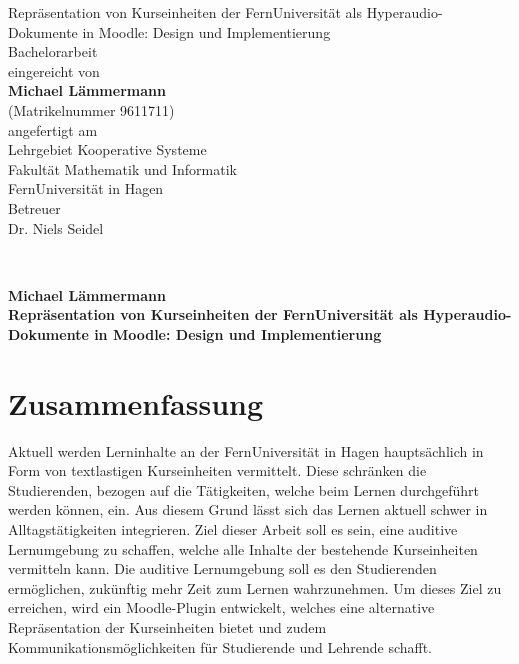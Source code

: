 \documentclass[twoside,bibliography=totoc,openany,numbers=noenddot]{fumi}
\title{\thesistitle}
\author{\thesisauthor}
\date{\today}
\newcommand{\thesistitle}{Repräsentation von Kurseinheiten der FernUniversität als Hyperaudio-Dokumente in Moodle: Design und Implementierung}
\newcommand{\thesisauthor}{Michael Lämmermann}
\newcommand{\thesistype}{Bachelorarbeit} %
\newcommand{\thesismatrikelnummer}{9611711}
\newcommand{\setttsize}[1]{\def\ttsize{#1}}%
\begin{document}
\sffamily
\pagestyle{empty}
\setttsize{\small}




\vspace{2cm}
\begin{center}\LARGE
\vfill
{\Huge\thesistitle}\\
\vfill
\thesistype\\
\vfill
eingereicht von\\[4pt]
\textbf{\thesisauthor}\\[4pt]
(Matrikelnummer \thesismatrikelnummer)\\
\vfill
angefertigt am\\
Lehrgebiet Kooperative Systeme\\
Fakultät Mathematik und Informatik\\
FernUniversität in Hagen\\
\vfill 
Betreuer\\
Dr. Niels Seidel
\vfill
\monthname[\the\month] \the\year
\end{center}
\newpage~\newpage

{\large\textbf{\thesisauthor}\\\textbf{\thesistitle}\vfill}\newpage~\newpage


\section*{Zusammenfassung}
Aktuell werden Lerninhalte an der FernUniversität in Hagen hauptsächlich in Form von textlastigen Kurseinheiten vermittelt. Diese schränken die Studierenden, bezogen auf die Tätigkeiten, welche beim Lernen durchgeführt werden können, ein. Aus diesem Grund lässt sich das Lernen aktuell schwer in Alltagstätigkeiten integrieren. Ziel dieser Arbeit soll es sein, eine auditive Lernumgebung zu schaffen, welche alle Inhalte der bestehende Kurseinheiten vermitteln kann. Die auditive Lernumgebung soll es den Studierenden ermöglichen, zukünftig mehr Zeit zum Lernen wahrzunehmen. Um dieses Ziel zu erreichen, wird ein Moodle-Plugin entwickelt, welches eine alternative Repräsentation der Kurseinheiten bietet und zudem Kommunikationsmöglichkeiten für Studierende und Lehrende schafft.\vfill
\end{document}
